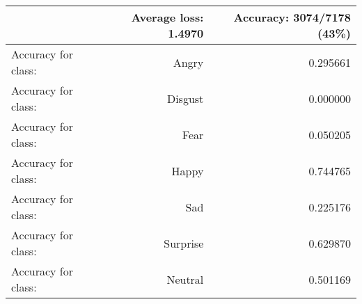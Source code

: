 \begin{tabular}{lrr}
\toprule
{} & Average loss: 1.4970 &  Accuracy: 3074/7178 (43\%) \\
\midrule
Accuracy for class: &                Angry &                   0.295661 \\
Accuracy for class: &              Disgust &                   0.000000 \\
Accuracy for class: &                 Fear &                   0.050205 \\
Accuracy for class: &                Happy &                   0.744765 \\
Accuracy for class: &                  Sad &                   0.225176 \\
Accuracy for class: &             Surprise &                   0.629870 \\
Accuracy for class: &              Neutral &                   0.501169 \\
\bottomrule
\end{tabular}
